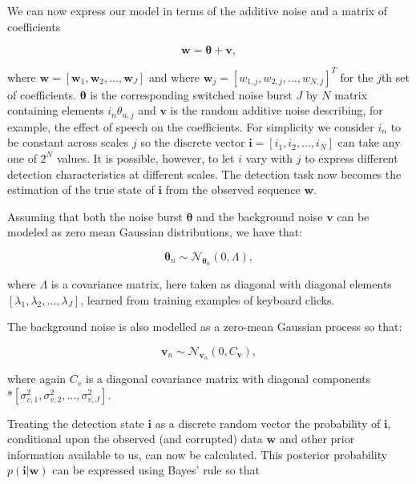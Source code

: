 We can now express our model in terms of the additive noise and a matrix of coefficients

\begin{equation}\label{eq:model2}
\boldsymbol{w} = \boldsymbol{\theta} + \boldsymbol{v},
\end{equation}

where $\boldsymbol{w} = [\boldsymbol{w}_1,\boldsymbol{w}_2,\ldots,\boldsymbol{w}_J]$ and where $\boldsymbol{w}_j = [w_{1,j}, w_{2,j}, \ldots, w_{N,j}]^T$ for the $j$th set of coefficients. $\boldsymbol{\theta}$ is the corresponding switched noise burst $J$ by $N$ matrix containing elements $i_{n}\theta_{n,j}$ and $\boldsymbol{v}$ is the random additive noise describing, for example, the effect of speech on the coefficients. For simplicity we consider $i_{n}$ to be constant across scales $j$ so the discrete vector $\boldsymbol{i} = [i_{1}, i_{2}, \ldots, i_{N}]$ can take any one of $2^{N}$ values. It is possible, however, to let $i$ vary with $j$ to express different detection characteristics at different scales. The detection task now becomes the estimation of the true state of $\boldsymbol{i}$ from the observed sequence $\boldsymbol{w}$.

Assuming that both the noise burst $\boldsymbol{\theta}$ and the background noise $\boldsymbol{v}$ can be modeled as zero mean Gaussian distributions, we have that:

\begin{equation}\label{eq:burst}
\boldsymbol{\theta}_n \sim \mathcal{N}_{\boldsymbol{\theta}_n}(0,\Lambda),
\end{equation}

where $\Lambda$ is a covariance matrix, here taken as diagonal with diagonal elements $\left[\lambda_{1}, \lambda_{2}, \ldots, \lambda_{J}\right]$, learned from training examples of keyboard clicks.

The background noise is also modelled as a zero-mean Gaussian process so that:

\begin{equation}\label{eq:noise}
\boldsymbol{v}_n \sim \mathcal{N}_{\boldsymbol{v}_n}(0,C_{\boldsymbol{v}}),
\end{equation}

where again $C_v$ is a diagonal covariance matrix with diagonal components \\*$[\sigma_{v,1}^2, \sigma_{v,2}^2, \ldots, \sigma_{v,J}^2]$.

Treating the detection state $\boldsymbol{i}$ as a discrete random vector the probability of $\boldsymbol{i}$, conditional upon the observed (and corrupted) data $\boldsymbol{w}$ and other prior information available to us, can now be calculated. This posterior probability $p(\boldsymbol{i}|\boldsymbol{w})$ can be expressed using Bayes' rule so that

